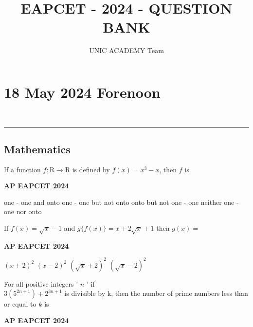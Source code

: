 \documentclass[11pt,paper=a4,answers]{exam}
\begin{document}
\title{EAPCET - 2024 - QUESTION BANK}
\author{UNIC ACADEMY Team}
\maketitle
\newpage

\section*{18 May 2024 Forenoon}
\noindent \\
\rule{\textwidth}{1.4pt}

\subsection*{Mathematics}
\begin{multicols}{2}
\begin{questions}



\question
If a function $f: \mathrm{R} \rightarrow \mathrm{R}$ is defined by $f(x)=x^3-x$, then $f$ is




\begin{flushright}
\small\textbf{AP EAPCET 2024}
\end{flushright}


\begin{choices}
\choice  one - one and onto
\choice one - one but not onto
\choice onto but not one - one
\choice neither one - one nor onto
\end{choices}


\question
If $f(x)=\sqrt{x}-1$ and $g\{f(x)\}=x+2 \sqrt{x}+1$ then $g(x)=$


\begin{flushright}
\small\textbf{AP EAPCET 2024}
\end{flushright}


\begin{choices}
\choice  $(x+2)^2$
\choice $(x-2)^2$
\choice $(\sqrt{x}+2)^2$
\choice $(\sqrt{x}-2)^2$
\end{choices}


\question
For all positive integers ' $n$ ' if \\ $3\left(5^{2 n+1}\right)+2^{3 n+1}$ is divisible by k, then the number of prime numbers less than or equal to $k$ is


\begin{flushright}
\small\textbf{AP EAPCET 2024}
\end{flushright}



\end{questions}
\end{multicols}
\end{document}
